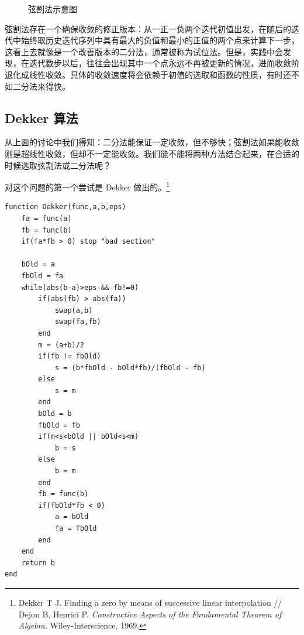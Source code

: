 \begin{figure}[htbp]
\centering
{}
\caption{弦割法示意图}
\label{fig:secant}
\end{figure}

弦割法存在一个确保收敛的修正版本：从一正一负两个迭代初值出发，在随后的迭代中始终取历史迭代序列中具有最大的负值和最小的正值的两个点来计算下一步，这看上去就像是一个改善版本的二分法，通常被称为试位法。但是，实践中会发现，在迭代数步以后，往往会出现其中一个点永远不再被更新的情况，进而收敛阶退化成线性收敛。具体的收敛速度将会依赖于初值的选取和函数的性质，有时还不如二分法来得快。

\subsection{Dekker 算法}

从上面的讨论中我们得知：二分法能保证一定收敛，但不够快；弦割法如果能收敛则是超线性收敛，但却不一定能收敛。我们能不能将两种方法结合起来，在合适的时候选取弦割法或二分法呢？

对这个问题的第一个尝试是 Dekker 做出的。\footnote{Dekker T J. Finding a zero by means of successive linear interpolation // Dejon B, Henrici P. \textit{Constructive Aspects of the Fundamental Theorem of Algebra}. Wiley-Interscience, 1969.}


\begin{algorithmBox}
\begin{lstlisting}[style=bellacode]
function Dekker(func,a,b,eps)
    fa = func(a)
    fb = func(b)
    if(fa*fb > 0) stop "bad section"

    bOld = a
    fbOld = fa
    while(abs(b-a)>eps && fb!=0)
        if(abs(fb) > abs(fa))
            swap(a,b)
            swap(fa,fb)
        end
        m = (a+b)/2
        if(fb != fbOld)
            s = (b*fbOld - bOld*fb)/(fbOld - fb)
        else
            s = m
        end
        bOld = b
        fbOld = fb
        if(m<s<bOld || bOld<s<m)
            b = s
        else
            b = m
        end
        fb = func(b)
        if(fbOld*fb < 0)
            a = bOld
            fa = fbOld
        end
    end
    return b
end
\end{lstlisting}
\end{algorithmBox}


